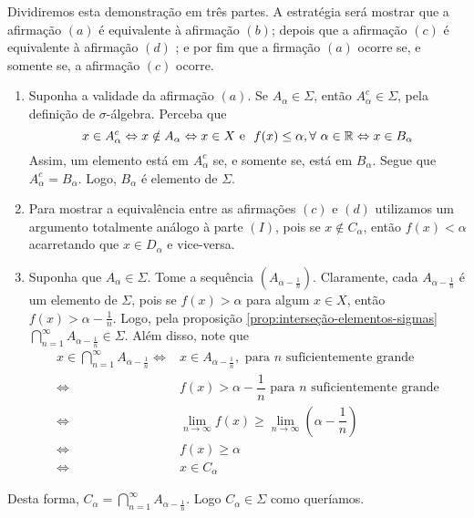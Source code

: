 \begin{prova}
    Dividiremos esta demonstração em três partes. A estratégia será mostrar que a afirmação $(a)$ é equivalente à afirmação $(b)$; depois que a afirmação $(c)$ é equivalente à afirmação $(d)$ ; e por fim que a firmação $(a)$ ocorre se, e somente se, a afirmação $(c)$ ocorre. 
    \begin{enumerate}[label* = (\Roman*)]
        \item Suponha a validade da afirmação $(a)$. Se $A_\alpha \in \Sigma$, então $A_\alpha^c \in \Sigma$, pela definição de $\sigma$-álgebra.
    Perceba que 
    $$
    x \in A_\alpha^c \Leftrightarrow   x \notin A_\alpha\\
    \Leftrightarrow  x \in X \textrm{\ e \ } f(x) \leq \alpha, \forall\ \alpha \in \R
    \Leftrightarrow x \in B_\alpha    
  $$ Assim, um elemento está em $A_\alpha^c$ se, e somente se, está em $B_\alpha$. Segue que $A_\alpha^c = B_\alpha$. Logo, $B_\alpha$ é elemento de $\Sigma$.
  \item Para mostrar a equivalência entre as afirmações $(c)$ e $(d)$ utilizamos um argumento totalmente análogo à parte $(I)$, pois se $x \notin C_\alpha$, então $f(x) < \alpha$ acarretando que $x \in D_\alpha$ e vice-versa.
  \item Suponha que $A_\alpha \in \Sigma$. Tome a sequência $\left(A_{\alpha -\frac{1}{n}}\right)$. Claramente, cada $A_{\alpha - \frac{1}{n}}$ é um elemento de $\Sigma$, pois se $f(x) > \alpha$ para algum $x \in X$, então $f(x) > \alpha -\frac{1}{n}$. Logo, pela proposição \ref{prop:interseção-elementos-sigmas} $\displaystyle \bigcap_{n = 1}^\infty A_{\alpha -\frac{1}{n}} \in \Sigma$. Além disso, note que 
\begin{align*}
    x \in \displaystyle \bigcap_{n = 1}^\infty A_{\alpha -\frac{1}{n}}
    \Leftrightarrow & x \in A_{\alpha - \frac{1}{n}}, \textrm{\ para  $n$ suficientemente grande}\\
    \Leftrightarrow & f(x)> \alpha -\dfrac{1}{n} \textrm{\ para  $n$ suficientemente grande}\\
    \Leftrightarrow &\lim_{n \to \infty} f(x) \geq \lim_{n \to \infty} \left(\alpha - \dfrac{1}{n}\right)\\
    \Leftrightarrow & f(x) \geq \alpha \\
    \Leftrightarrow & x \in C_\alpha
\end{align*}
    \end{enumerate}
Desta forma, $C_\alpha = \displaystyle \bigcap_{n = 1}^\infty A_{\alpha -\frac{1}{n}} $. Logo $C_\alpha \in \Sigma$ como queríamos.


\end{prova}
